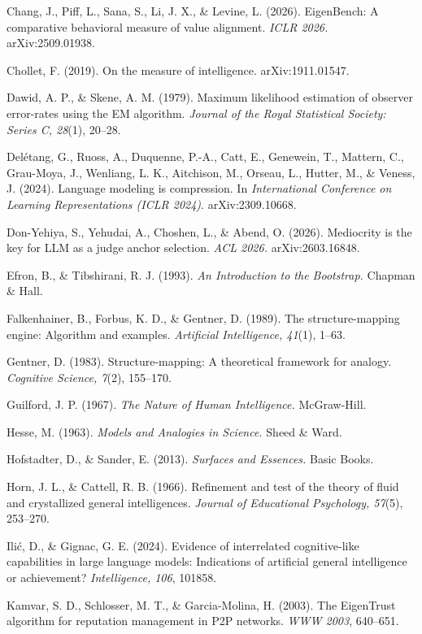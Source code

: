 \documentclass{article}
\begin{document}
Chang, J., Piff, L., Sana, S., Li, J. X., \& Levine, L. (2026). EigenBench: A comparative behavioral measure of value alignment. \emph{ICLR 2026.} arXiv:2509.01938.

Chollet, F. (2019). On the measure of intelligence. arXiv:1911.01547.

Dawid, A. P., \& Skene, A. M. (1979). Maximum likelihood estimation of observer error-rates using the EM algorithm. \emph{Journal of the Royal Statistical Society: Series C, 28}(1), 20--28.

Del\'{e}tang, G., Ruoss, A., Duquenne, P.-A., Catt, E., Genewein, T., Mattern, C., Grau-Moya, J., Wenliang, L. K., Aitchison, M., Orseau, L., Hutter, M., \& Veness, J. (2024). Language modeling is compression. In \emph{International Conference on Learning Representations (ICLR 2024)}. arXiv:2309.10668.

Don-Yehiya, S., Yehudai, A., Choshen, L., \& Abend, O. (2026). Mediocrity is the key for LLM as a judge anchor selection. \emph{ACL 2026.} arXiv:2603.16848.

Efron, B., \& Tibshirani, R. J. (1993). \emph{An Introduction to the Bootstrap.} Chapman \& Hall.

Falkenhainer, B., Forbus, K. D., \& Gentner, D. (1989). The structure-mapping engine: Algorithm and examples. \emph{Artificial Intelligence, 41}(1), 1--63.

Gentner, D. (1983). Structure-mapping: A theoretical framework for analogy. \emph{Cognitive Science, 7}(2), 155--170.

Guilford, J. P. (1967). \emph{The Nature of Human Intelligence.} McGraw-Hill.

Hesse, M. (1963). \emph{Models and Analogies in Science.} Sheed \& Ward.

Hofstadter, D., \& Sander, E. (2013). \emph{Surfaces and Essences.} Basic Books.

Horn, J. L., \& Cattell, R. B. (1966). Refinement and test of the theory of fluid and crystallized general intelligences. \emph{Journal of Educational Psychology, 57}(5), 253--270.

Ili\'{c}, D., \& Gignac, G. E. (2024). Evidence of interrelated cognitive-like capabilities in large language models: Indications of artificial general intelligence or achievement? \emph{Intelligence, 106}, 101858.

Kamvar, S. D., Schlosser, M. T., \& Garcia-Molina, H. (2003). The EigenTrust algorithm for reputation management in P2P networks. \emph{WWW 2003}, 640--651.
\end{document}
